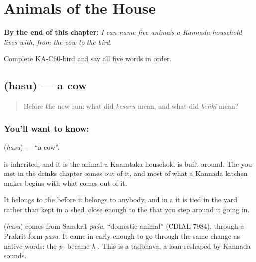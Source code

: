 
\chapter{Animals of the House}
\label{ch:ka-animals}

\begin{chapteropening}
\textbf{By the end of this chapter:} \emph{I can name five animals a Kannada household lives with, from the cow to the bird.}

Complete KA-C60-bird and say all five words in order.
\end{chapteropening}

\section[\texorpdfstring{\kn{ಹಸು} (hasu)}{ಹಸು (hasu)}]{ (hasu) — a cow}

\label{lesson:KA-C60-cow}



\begin{quote}
Before the new run: what did \emph{kesaru} mean, and what did \emph{beṅki} mean?
\end{quote}

\subsection*{You'll want to know: }
\textbf{} (\emph{hasu}) — \textquotedblleft{}a cow\textquotedblright{}.

 is inherited, and it is the animal a Karnataka household is built around. The  you met in the drinks chapter comes out of it, and most of what a Kannada kitchen makes begins with what comes out of it.

It belongs to the  before it belongs to anybody, and in a  it is tied in the yard rather than kept in a shed, close enough to the  that you step around it going in.

\begin{cousinweb}
\textbf{} (\emph{hasu}) comes from Sanskrit \emph{paśu}, \textquotedblleft{}domestic animal\textquotedblright{} (CDIAL 7984), through a Prakrit form \emph{pasu}. It came in early enough to go through the same change as native words: the \emph{p-} became \emph{h-}. This is a tadbhava, a loan reshaped by Kannada sounds.
\end{cousinweb}

